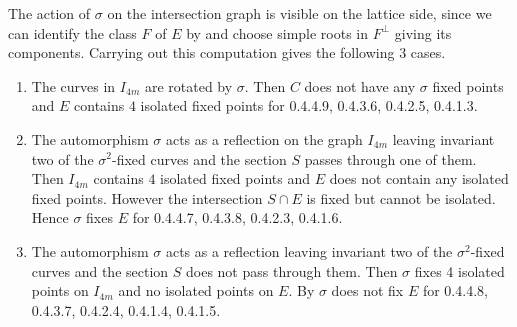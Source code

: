 The action of $\sigma$ on the intersection graph is visible on the lattice side, since we can identify the class $F$ of $E$ by  and choose simple roots in $F^\perp$ giving its components.
Carrying out this computation gives the following $3$ cases.
\begin{enumerate}
\item The curves in $I_{4m}$ are rotated by $\sigma$. Then $C$ does not have any $\sigma$ fixed points and $E$ contains $4$ isolated fixed points for 0.4.4.9, 0.4.3.6, 0.4.2.5, 0.4.1.3.

\item The automorphism $\sigma$ acts as a reflection on the graph $I_{4m}$ leaving invariant two of the $\sigma^2$-fixed curves and the section $S$ passes through one of them. Then $I_{4m}$ contains $4$ isolated fixed points and $E$ does not contain any isolated fixed points. However the intersection $S \cap E$ is fixed but cannot be isolated. Hence $\sigma$ fixes $E$ for 0.4.4.7, 0.4.3.8, 0.4.2.3, 0.4.1.6.

\item The automorphism $\sigma$ acts as a reflection leaving invariant two of the $\sigma^2$-fixed curves and the section $S$ does not pass through them. Then $\sigma$ fixes 4 isolated points on $I_{4m}$ and no isolated points on $E$. By  $\sigma$ does not fix $E$ for 0.4.4.8, 0.4.3.7, 0.4.2.4, 0.4.1.4, 0.4.1.5.
\end{enumerate}
%


